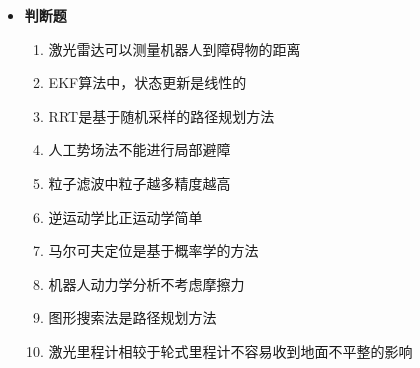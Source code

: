 \documentclass[../main.tex]{subfiles}
\begin{document}
\begin{itemize}
\begin{enumerate}
    \end{enumerate}

    \item \textbf{判断题}
    \begin{enumerate}
        \item 激光雷达可以测量机器人到障碍物的距离
        \\{\small\kaishu{\textcolor{blue}{√ 这题是何意味...}}}
        \item EKF算法中，状态更新是线性的
        \\{\small\kaishu{\textcolor{blue}{× 非线性的，所以才要做线性化。}}}
        \item RRT是基于随机采样的路径规划方法
        \\{\small\kaishu{\textcolor{blue}{√}}}
        \item 人工势场法不能进行局部避障
        \\{\small\kaishu{\textcolor{blue}{×}}}
        \item 粒子滤波中粒子越多精度越高
        \\{\small\kaishu{\textcolor{blue}{√ 只是会带来计算负担。}}}
        \item 逆运动学比正运动学简单
        \\{\small\kaishu{\textcolor{blue}{√ 这题是何意味...}}}
        \item 马尔可夫定位是基于概率学的方法
        \\{\small\kaishu{\textcolor{blue}{√}}}
        \item 机器人动力学分析不考虑摩擦力
        \\{\small\kaishu{\textcolor{blue}{机器人运动学建模，目前本课程已无此内容。}}}
        \item 图形搜索法是路径规划方法
        \\{\small\kaishu{\textcolor{blue}{× 图形搜索法是轨迹规划方法。}}}
        \item 激光里程计相较于轮式里程计不容易收到地面不平整的影响
        \\{\small\kaishu{\textcolor{blue}{√}}}
    \end{enumerate}


\end{itemize}
\end{document}
